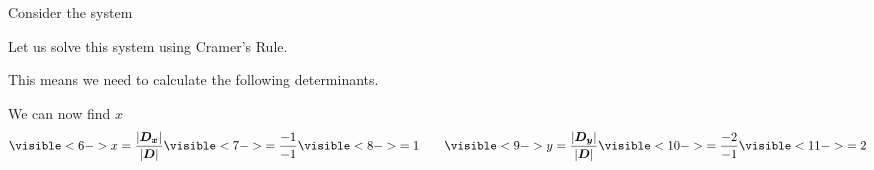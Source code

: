 \documentclass{beamer}
\begin{document}
\begin{frame}
\begin{example}
Consider the system
\begin{center}
\end{center}\pause
Let us solve this system using Cramer's Rule.

This means we need to calculate the following determinants.
\begin{center}
\end{center}
We can now find $x$ 
\begin{equation*}
\visible<6->{x=\dfrac{\abs{\mat{D_x}}}{\abs{\mat{D}}}\visible<7->{=\dfrac{-1}{-1}\visible<8->{=1}}}
\qquad
\visible<9->{y=\dfrac{\abs{\mat{D_y}}}{\abs{\mat{D}}}\visible<10->{=\dfrac{-2}{-1}\visible<11->{=2}}}
\end{equation*}
\end{example}
\end{frame}
\end{document}
